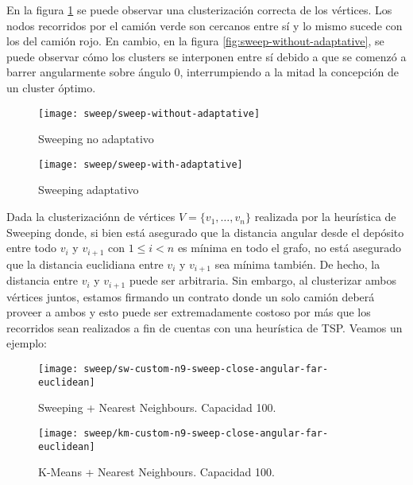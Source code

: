 En la figura \ref{fig:sweep-with-adaptative} se puede observar una clusterización correcta de los vértices. Los nodos recorridos por el camión verde son cercanos entre sí y lo mismo sucede con los del camión rojo. En cambio, en la figura \ref{fig:sweep-without-adaptative}, se puede observar cómo los clusters se interponen entre sí debido a que se comenzó a barrer angularmente sobre ángulo $0$, interrumpiendo a la mitad la concepción de un cluster óptimo.
\begin{figure}[H]
	\centering
	\begin{minipage}{0.48\textwidth}
		\centering
		\texttt{[image: sweep/sweep-without-adaptative]}
		\caption{\footnotesize Sweeping no adaptativo}
		\label{fig:sweep-without-adaptative}
	\end{minipage}%
	\hspace{0.03\textwidth}
	\begin{minipage}{0.48\textwidth}
		\centering
		\texttt{[image: sweep/sweep-with-adaptative]}
		\caption{\footnotesize Sweeping adaptativo}
		\label{fig:sweep-with-adaptative}
	\end{minipage}%
\end{figure}

Dada la clusterizaciónn de vértices $V=\{v_{1}, \dots, v_{n}\}$ realizada por la heurística de Sweeping donde, si bien está asegurado que la distancia angular desde el depósito entre todo $v_{i}$ y $v_{i+1}$ con $1 \leq i < n$ es mínima en todo el grafo, no está asegurado que la distancia euclidiana entre $v_{i}$ y $v_{i+1}$ sea mínima también. De hecho, la distancia entre $v_{i}$ y $v_{i+1}$ puede ser arbitraria. Sin embargo, al clusterizar ambos vértices juntos, estamos firmando un contrato donde un solo camión deberá proveer a ambos y esto puede ser extremadamente costoso por más que los recorridos sean realizados a fin de cuentas con una heurística de TSP. Veamos un ejemplo:

\begin{figure}[H]
	\centering
	\begin{minipage}{0.48\textwidth}
		\centering
		\texttt{[image: sweep/sw-custom-n9-sweep-close-angular-far-euclidean]}
		\caption{\footnotesize Sweeping + Nearest Neighbours. Capacidad 100.}
		\label{fig:sw-custom-n9-sweep-close-angular-far-euclidean}
	\end{minipage}%
	\hspace{0.03\textwidth}
	\begin{minipage}{0.48\textwidth}
		\centering
		\texttt{[image: sweep/km-custom-n9-sweep-close-angular-far-euclidean]}
		\caption{\footnotesize K-Means + Nearest Neighbours. Capacidad 100.}
		\label{fig:km-custom-n9-sweep-close-angular-far-euclidean}
	\end{minipage}%
\end{figure}

